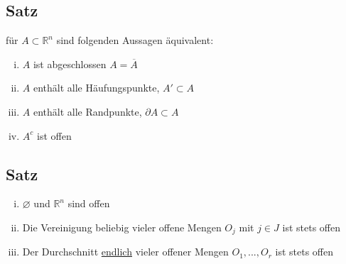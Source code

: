 \documentclass[11pt,a4paper]{book}
\newcommand {\Rn}	{\mathbb{R}^n}
\newcommand{\1}    	{\mathbbm{1}}
\begin{document}
\subsection{Satz}
für \(A \subset \Rn\) sind folgenden Aussagen äquivalent:
\begin{enumerate}[(i)]
	\item \(A\) ist abgeschlossen \(A = \overline{A}\)
	\item \(A\) enthält alle Häufungspunkte, \(A' \subset A\)
	\item \(A\) enthält alle Randpunkte, \(\partial A \subset A\)
	\item \(A^c\) ist offen
\end{enumerate}

\subsection{Satz}
\begin{enumerate}[(i)]
	\item \(\varnothing\) und \(\Rn\) sind offen
	\item Die Vereinigung beliebig vieler offene Mengen \(O_j\) mit \(j \in J\) ist stets offen
	\item Der Durchschnitt \underline{endlich} vieler offener Mengen \(O_1, ..., O_r\) ist stets offen
\end{enumerate}
\end{document}
